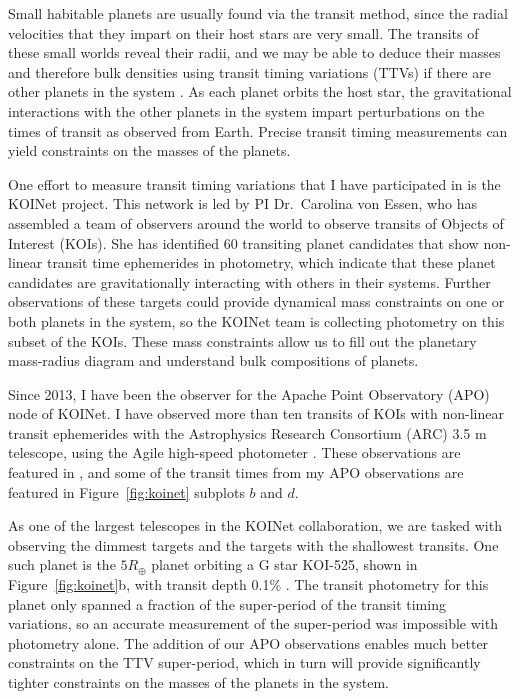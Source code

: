Small habitable planets are usually found via the transit method, since the radial velocities that they impart on their host stars are very small. The transits of these small worlds reveal their radii, and we may be able to deduce their masses and therefore bulk densities using transit timing variations (TTVs) if there are other planets in the system \citep{Agol2005, Holman2005}. As each planet orbits the host star, the gravitational interactions with the other planets in the system impart perturbations on the times of transit as observed from Earth. Precise transit timing measurements can yield constraints on the masses of the planets.

One effort to measure transit timing variations that I have participated in is the KOINet project. This network is led by PI Dr.~Carolina von Essen, who has assembled a team of observers around the world to observe transits of \kepler Objects of Interest (KOIs). She has identified 60 transiting planet candidates that show non-linear transit time ephemerides in \kepler photometry, which indicate that these planet candidates are gravitationally interacting with others in their systems. Further observations of these targets could provide dynamical mass constraints on one or both planets in the system, so the KOINet team is collecting photometry on this subset of the KOIs. These mass constraints allow us to fill out the planetary mass-radius diagram and understand bulk compositions of planets.

Since 2013, I have been the observer for the Apache Point Observatory (APO) node of KOINet. I have observed more than ten transits of KOIs with non-linear transit ephemerides with the Astrophysics Research Consortium (ARC) 3.5 m telescope, using the Agile high-speed photometer \citep{Mukadam2011}. These observations are featured in \citet{vonEssen2018}, and some of the transit times from my APO observations are featured in Figure~\ref{fig:koinet} subplots $b$ and $d$. 

As one of the largest telescopes in the KOINet collaboration, we are tasked with observing the dimmest targets and the targets with the shallowest transits. One such planet is the $5 R_\oplus$ planet orbiting a G star KOI-525, shown in Figure~\ref{fig:koinet}b, with transit depth 0.1\% \citep{Batalha2013}. The \kepler transit photometry for this planet only spanned a fraction of the super-period of the transit timing variations, so an accurate measurement of the super-period was impossible with \kepler photometry alone. The addition of our APO observations enables much better constraints on the TTV super-period, which in turn will provide significantly tighter constraints on the masses of the planets in the system.
